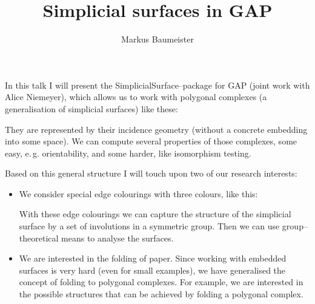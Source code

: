 \documentclass{scrartcl}
\author{Markus Baumeister}
\title{Simplicial surfaces in GAP}
\begin{document}
\maketitle

In this talk I will present the SimplicialSurface--package for GAP (joint work 
with Alice Niemeyer), which allows us to work with polygonal complexes (a 
generalisation of simplicial surfaces) like these:
        \begin{center}
            
        \end{center} 

    They are represented by their incidence geometry (without a concrete
    embedding into some space).
    We can compute several properties of those
    complexes, some easy, e.\,g. orientability, and some
    harder, like isomorphism testing.

    Based on this general structure I will touch upon two of our research
    interests:
    \begin{itemize}
        \item We consider special edge colourings with three colours, like
            this:
            \begin{center}
            \end{center}
            With these edge colourings we can capture the structure of
            the simplicial surface by a set of involutions in a symmetric
            group. Then we can use group--theoretical means to analyse the
            surfaces.
        \item We are interested in the folding of paper. Since working with
            embedded surfaces is very hard (even for small examples), we have
            generalised the concept of folding to polygonal complexes. For 
            example, we are interested in the possible structures that can
            be
            achieved by folding a polygonal complex.
    \end{itemize}
\end{document}
